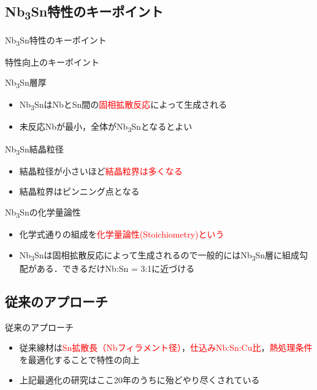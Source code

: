\documentclass[aspectratio=169, unicode, 10pt]{beamer}
\begin{document}
	\subsection{Nb\textsubscript{3}Sn特性のキーポイント}
	\begin{frame}{Nb\textsubscript{3}Sn特性のキーポイント}
		\begin{block}{特性向上のキーポイント}
			\begin{block}{Nb\textsubscript{3}Sn層厚}
				\begin{itemize}
					\item Nb\textsubscript{3}SnはNbとSn間の\textcolor{red}{固相拡散反応}によって生成される
					\item 未反応Nbが最小，全体がNb\textsubscript{3}Snとなるとよい
				\end{itemize}
			\end{block}
			\begin{block}{Nb\textsubscript{3}Sn結晶粒径}
				\begin{itemize}
					\item 結晶粒径が小さいほど\textcolor{red}{結晶粒界は多くなる}
					\item 結晶粒界はピンニング点となる
				\end{itemize}
			\end{block}
			\begin{block}{Nb\textsubscript{3}Snの化学量論性}
				\begin{itemize}
					\item 化学式通りの組成を\textcolor{red}{化学量論性(Stoichiometry)という}
					\item Nb\textsubscript{3}Snは固相拡散反応によって生成されるので一般的にはNb\textsubscript{3}Sn層に組成勾配がある．できるだけNb:Sn = 3:1に近づける
				\end{itemize}
			\end{block}
		\end{block}
	\end{frame}

	\subsection{従来のアプローチ}
	\begin{frame}{従来のアプローチ}
		\begin{itemize}
			\item 従来線材は\textcolor{red}{Sn拡散長（Nbフィラメント径）}，\textcolor{red}{仕込みNb:Sn:Cu比}，\textcolor{red}{熱処理条件}を最適化することで特性の向上
			\item 上記最適化の研究はここ20年のうちに殆どやり尽くされている
		\end{itemize}	
		\centering
		\pause{\Large \textcolor{red}{抜本的な解決策が必要}}
	\end{frame}
\end{document}
